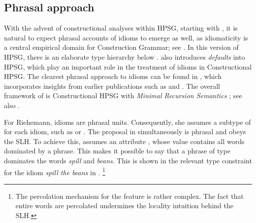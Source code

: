 \documentclass[output=paper
 	        ,biblatex
                ,babelshorthands
                ,newtxmath
                ,draftmode
                ,colorlinks, citecolor=brown
]{langscibook}
\begin{document}

\subsection{Phrasal approach}
\label{Sec-Phrasal}

%
With the advent of constructional analyses within HPSG, starting with
\citet{Sag97a}, it is natural to expect phrasal accounts of idioms to emerge as well, as
idiomaticity is a central empirical domain for Construction Grammar; see
.  In this version of HPSG, there is an elaborate type hierarchy below
.  \citet{Sag97a} also introduces \emph{defaults} into HPSG, which play an
important role in the treatment of idioms in Constructional HPSG.  The clearest phrasal approach to
idioms can be found in \citet{Riehemann2001a}, which incorporates insights from earlier publications
such as \citet{Riehemann97a} and \citet{RB99a}.
%
The overall framework of \citet{Riehemann2001a} is Constructional HPSG with \emph{Minimal Recursion Semantics}  \citep{CFMRS95a-u,CFPS2005a}; see also .

\begin{sloppypar}
For Riehemann, idioms are phrasal units.  Consequently, she assumes a subtype of  for each idiom, such as  or .  The proposal in \citet{Riehemann2001a} simultaneously is phrasal and obeys the SLH. To achieve this, \citet{Riehemann2001a} assumes an attribute , whose value contains all words dominated by a phrase. This makes it possible to say that a phrase of type  dominates the words \emph{spill} and \emph{beans}. This is shown in the relevant type constraint for the idiom \emph{spill the beans} in .%
\footnote{The percolation mechanism for the feature  is rather complex. 
The fact that entire words are percolated undermines the locality intuition behind the SLH.
}
\end{sloppypar}
\end{document}
